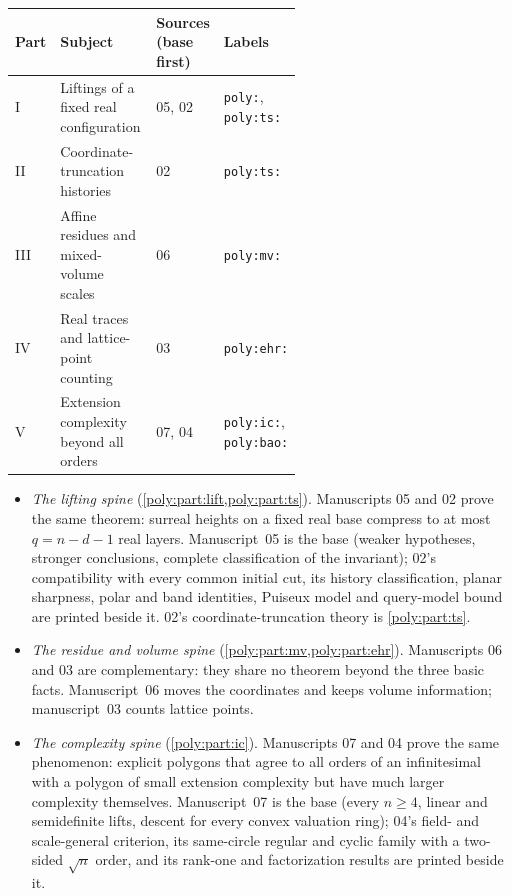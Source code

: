 \documentclass[11pt,a4paper]{article}
\numberwithin{equation}{section}
\theoremstyle{plain}
\begin{document}
\begin{center}\small
\begin{tabular}{@{}lp{0.37\linewidth}p{0.2\linewidth}l@{}}
\toprule
Part & Subject & Sources (base first) & Labels\\
\midrule
I & Liftings of a fixed real configuration & 05, 02 & \texttt{poly:}, \texttt{poly:ts:}\\
II & Coordinate-truncation histories & 02 & \texttt{poly:ts:}\\
III & Affine residues and mixed-volume scales & 06 & \texttt{poly:mv:}\\
IV & Real traces and lattice-point counting & 03 & \texttt{poly:ehr:}\\
V & Extension complexity beyond all orders & 07, 04 & \texttt{poly:ic:}, \texttt{poly:bao:}\\
\bottomrule
\end{tabular}
\end{center}

\begin{itemize}
\item \emph{The lifting spine} (\cref{poly:part:lift,poly:part:ts}).
Manuscripts 05 and 02 prove the same theorem: surreal heights on a fixed real
base compress to at most $q=n-d-1$ real layers. Manuscript~05 is the base
(weaker hypotheses, stronger conclusions, complete classification of the
invariant); 02's compatibility with every common initial cut, its history
classification, planar sharpness, polar and band identities, Puiseux model
and query-model bound are printed beside it. 02's coordinate-truncation
theory is \cref{poly:part:ts}.
\item \emph{The residue and volume spine} (\cref{poly:part:mv,poly:part:ehr}).
Manuscripts 06 and 03 are complementary: they share no theorem beyond the
three basic facts. Manuscript~06 moves the coordinates and keeps volume
information; manuscript~03 counts lattice points.
\item \emph{The complexity spine} (\cref{poly:part:ic}). Manuscripts 07 and 04
prove the same phenomenon: explicit polygons that agree to all orders of an
infinitesimal with a polygon of small extension complexity but have much
larger complexity themselves. Manuscript~07 is the base (every $n\ge4$,
linear and semidefinite lifts, descent for every convex valuation ring);
04's field- and scale-general criterion, its same-circle regular and cyclic
family with a two-sided $\sqrt n$ order, and its rank-one and factorization
results are printed beside it.
\end{itemize}
\end{document}
